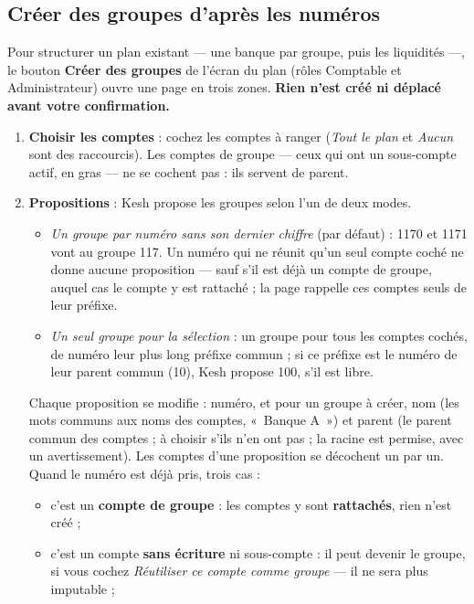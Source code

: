 \documentclass[a4paper,11pt,oneside]{article}
\begin{document}
\subsection{Créer des groupes d'après les numéros}\label{sec:creer-groupes}

Pour structurer un plan existant --- une banque par groupe, puis les liquidités ---, le bouton
\textbf{Créer des groupes} de l'écran du plan (rôles Comptable et Administrateur) ouvre une page en
trois zones. \textbf{Rien n'est créé ni déplacé avant votre confirmation.}

\begin{enumerate}
    \item \textbf{Choisir les comptes} : cochez les comptes à ranger (\emph{Tout le plan} et
    \emph{Aucun} sont des raccourcis). Les comptes de groupe --- ceux qui ont un sous-compte actif,
    en gras --- ne se cochent pas : ils servent de parent.
    \item \textbf{Propositions} : Kesh propose les groupes selon l'un de deux modes.
    \begin{itemize}
        \item \emph{Un groupe par numéro sans son dernier chiffre} (par défaut) : 1170 et 1171
        vont au groupe 117. Un numéro qui ne réunit qu'un seul compte coché ne donne aucune
        proposition --- sauf s'il est déjà un compte de groupe, auquel cas le compte y est rattaché ;
        la page rappelle ces comptes seuls de leur préfixe.
        \item \emph{Un seul groupe pour la sélection} : un groupe pour tous les comptes cochés, de
        numéro leur plus long préfixe commun ; si ce préfixe est le numéro de leur parent commun
        (10), Kesh propose 100, s'il est libre.
    \end{itemize}
    Chaque proposition se modifie : numéro, et pour un groupe à créer, nom (les mots communs aux
    noms des comptes, «~Banque A~») et parent (le parent commun des comptes ; à choisir s'ils
    n'en ont pas ; la racine est permise, avec un avertissement). Les comptes d'une proposition se
    décochent un par un. Quand le numéro est déjà pris, trois cas :
    \begin{itemize}
        \item c'est un \textbf{compte de groupe} : les comptes y sont \textbf{rattachés}, rien n'est créé ;
        \item c'est un compte \textbf{sans écriture} ni sous-compte : il peut devenir le groupe, si vous
        cochez \emph{Réutiliser ce compte comme groupe} --- il ne sera plus imputable ;

\end{itemize}
\end{enumerate}
\end{document}
